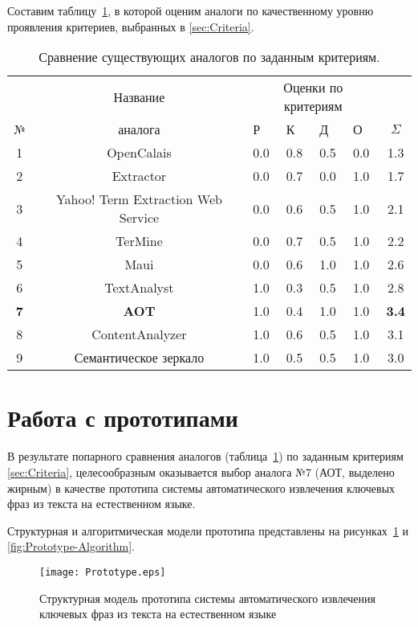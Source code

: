 Составим таблицу~\ref{tab:Analogs}, в которой оценим
аналоги по качественному уровню проявления критериев,
выбранных в \ref{sec:Criteria}.

\begin{table}[H]
\caption{\label{tab:Analogs}Сравнение существующих
аналогов по заданным критериям.}
\begin{tabular}{|c||c||*{4}{p{1cm}|}|c|}
\hline
  & Название & \multicolumn{4}{c||}{Оценки по критериям} & \\
                \cline{3-6}
№ & аналога         &  Р  &  К  &  Д  &  О  & \huge $\Sigma$ \\
\hline
\hline
1 & OpenCalais      & 0.0 & 0.8 & 0.5 & 0.0 & 1.3 \\
\hline
2 & Extractor       & 0.0 & 0.7 & 0.0 & 1.0 & 1.7 \\
\hline
3 & Yahoo! Term Extraction Web Service
                    & 0.0 & 0.6 & 0.5 & 1.0 & 2.1 \\
\hline
4 & TerMine         & 0.0 & 0.7 & 0.5 & 1.0 & 2.2 \\
\hline
5 & Maui            & 0.0 & 0.6 & 1.0 & 1.0 & 2.6 \\
\hline
6 & TextAnalyst     & 1.0 & 0.3 & 0.5 & 1.0 & 2.8 \\
\hline
\textbf{7} & \textbf{AOT}
                    & 1.0 & 0.4 & 1.0 & 1.0 & \textbf{3.4} \\
\hline
8 & ContentAnalyzer & 1.0 & 0.6 & 0.5 & 1.0 & 3.1 \\
\hline
9 & Семантическое
     зеркало        & 1.0 & 0.5 & 0.5 & 1.0 & 3.0 \\
\hline
\end{tabular}
\end{table}

\section{Работа с прототипами}
В результате попарного сравнения аналогов (таблица~\ref{tab:Analogs})
по заданным критериям \ref{sec:Criteria}, целесообразным оказывается
выбор аналога №7 (АОТ, выделено жирным) в качестве прототипа системы
автоматического извлечения ключевых фраз из текста на
естественном языке.

Структурная и алгоритмическая модели прототипа представлены на
рисунках~\ref{fig:Prototype} и \ref{fig:Prototype-Algorithm}.

\begin{figure}[ht]
  \centering
  \texttt{[image: Prototype.eps]}
  \caption{Структурная модель прототипа системы автоматического
извлечения ключевых фраз из текста на естественном языке}
  \label{fig:Prototype}
\end{figure}

